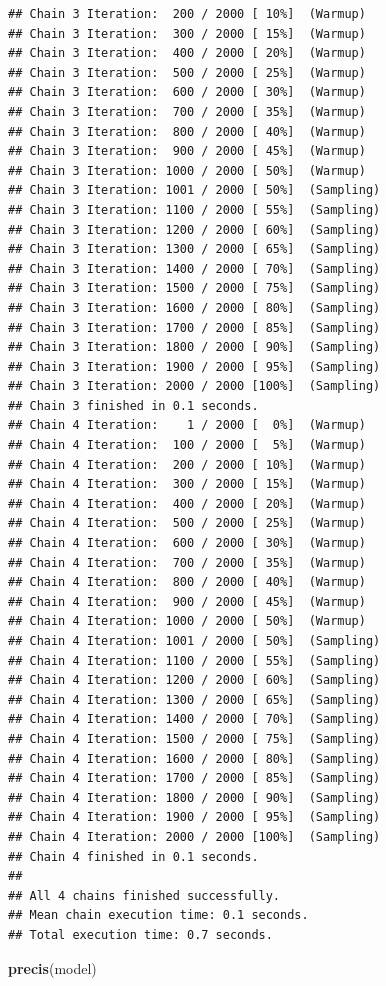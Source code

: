 \documentclass[
]{book}
\newenvironment{Shaded}{\begin{snugshade}}{\end{snugshade}}
\newcommand{\FunctionTok}[1]{\textcolor[rgb]{0.13,0.29,0.53}{\textbf{#1}}}
\newcommand{\NormalTok}[1]{#1}
\begin{document}
\begin{verbatim}
## Chain 3 Iteration:  200 / 2000 [ 10%]  (Warmup) 
## Chain 3 Iteration:  300 / 2000 [ 15%]  (Warmup) 
## Chain 3 Iteration:  400 / 2000 [ 20%]  (Warmup) 
## Chain 3 Iteration:  500 / 2000 [ 25%]  (Warmup) 
## Chain 3 Iteration:  600 / 2000 [ 30%]  (Warmup) 
## Chain 3 Iteration:  700 / 2000 [ 35%]  (Warmup) 
## Chain 3 Iteration:  800 / 2000 [ 40%]  (Warmup) 
## Chain 3 Iteration:  900 / 2000 [ 45%]  (Warmup) 
## Chain 3 Iteration: 1000 / 2000 [ 50%]  (Warmup) 
## Chain 3 Iteration: 1001 / 2000 [ 50%]  (Sampling) 
## Chain 3 Iteration: 1100 / 2000 [ 55%]  (Sampling) 
## Chain 3 Iteration: 1200 / 2000 [ 60%]  (Sampling) 
## Chain 3 Iteration: 1300 / 2000 [ 65%]  (Sampling) 
## Chain 3 Iteration: 1400 / 2000 [ 70%]  (Sampling) 
## Chain 3 Iteration: 1500 / 2000 [ 75%]  (Sampling) 
## Chain 3 Iteration: 1600 / 2000 [ 80%]  (Sampling) 
## Chain 3 Iteration: 1700 / 2000 [ 85%]  (Sampling) 
## Chain 3 Iteration: 1800 / 2000 [ 90%]  (Sampling) 
## Chain 3 Iteration: 1900 / 2000 [ 95%]  (Sampling) 
## Chain 3 Iteration: 2000 / 2000 [100%]  (Sampling) 
## Chain 3 finished in 0.1 seconds.
## Chain 4 Iteration:    1 / 2000 [  0%]  (Warmup) 
## Chain 4 Iteration:  100 / 2000 [  5%]  (Warmup) 
## Chain 4 Iteration:  200 / 2000 [ 10%]  (Warmup) 
## Chain 4 Iteration:  300 / 2000 [ 15%]  (Warmup) 
## Chain 4 Iteration:  400 / 2000 [ 20%]  (Warmup) 
## Chain 4 Iteration:  500 / 2000 [ 25%]  (Warmup) 
## Chain 4 Iteration:  600 / 2000 [ 30%]  (Warmup) 
## Chain 4 Iteration:  700 / 2000 [ 35%]  (Warmup) 
## Chain 4 Iteration:  800 / 2000 [ 40%]  (Warmup) 
## Chain 4 Iteration:  900 / 2000 [ 45%]  (Warmup) 
## Chain 4 Iteration: 1000 / 2000 [ 50%]  (Warmup) 
## Chain 4 Iteration: 1001 / 2000 [ 50%]  (Sampling) 
## Chain 4 Iteration: 1100 / 2000 [ 55%]  (Sampling) 
## Chain 4 Iteration: 1200 / 2000 [ 60%]  (Sampling) 
## Chain 4 Iteration: 1300 / 2000 [ 65%]  (Sampling) 
## Chain 4 Iteration: 1400 / 2000 [ 70%]  (Sampling) 
## Chain 4 Iteration: 1500 / 2000 [ 75%]  (Sampling) 
## Chain 4 Iteration: 1600 / 2000 [ 80%]  (Sampling) 
## Chain 4 Iteration: 1700 / 2000 [ 85%]  (Sampling) 
## Chain 4 Iteration: 1800 / 2000 [ 90%]  (Sampling) 
## Chain 4 Iteration: 1900 / 2000 [ 95%]  (Sampling) 
## Chain 4 Iteration: 2000 / 2000 [100%]  (Sampling) 
## Chain 4 finished in 0.1 seconds.
## 
## All 4 chains finished successfully.
## Mean chain execution time: 0.1 seconds.
## Total execution time: 0.7 seconds.
\end{verbatim}

\begin{Shaded}
\begin{Highlighting}[]
\FunctionTok{precis}\NormalTok{(model)}
\end{Highlighting}
\end{Shaded}
\end{document}
